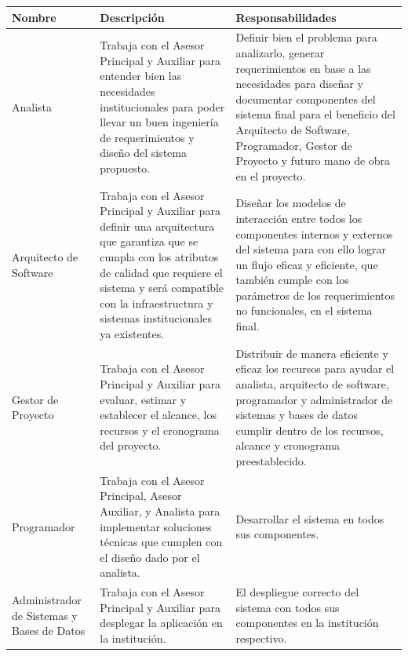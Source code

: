 \begin{longtable}{|p{}|p{}|p{}|}
  \hline
  \textbf{Nombre} & \textbf{Descripción} & \textbf{Responsabilidades} \\
  \hline
  \endhead
  Analista & Trabaja con el Asesor Principal y Auxiliar para entender bien las necesidades institucionales para poder llevar un buen ingeniería de requerimientos y diseño del sistema propuesto. & Definir bien el problema para analizarlo, generar requerimientos en base a las necesidades para diseñar y documentar componentes del sistema final para el beneficio del Arquitecto de Software, Programador, Gestor de Proyecto y futuro mano de obra en el proyecto. \\
  \hline
  Arquitecto de Software & Trabaja con el Asesor Principal y Auxiliar para definir una arquitectura que garantiza que se cumpla con los atributos de calidad que requiere el sistema y será compatible con la infraestructura y sistemas institucionales ya existentes. & Diseñar los modelos de interacción entre todos los componentes internos y externos del sistema para con ello lograr un flujo eficaz y eficiente, que también cumple con los parámetros de los requerimientos no funcionales, en el sistema final. \\
  \hline
  Gestor de Proyecto & Trabaja con el Asesor Principal y Auxiliar para evaluar, estimar y establecer el alcance, los recursos y el cronograma del proyecto. & Distribuir de manera eficiente y eficaz los recursos para ayudar el analista, arquitecto de software, programador y administrador de sistemas y bases de datos cumplir dentro de los recursos, alcance y cronograma preestablecido. \\
  \hline
  Programador & Trabaja con el Asesor Principal, Asesor Auxiliar, y Analista para implementar soluciones técnicas que cumplen con el diseño dado por el analista. & Desarrollar el sistema en todos sus componentes. \\
  \hline
  Administrador de Sistemas y Bases de Datos & Trabaja con el Asesor Principal y Auxiliar para desplegar la aplicación en la institución. & El despliegue correcto del sistema con todos sus componentes en la institución respectivo. \\

\end{longtable}
